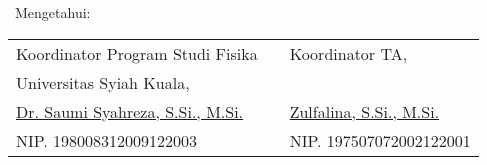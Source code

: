 {\renewcommand{\arraystretch}{0.8}
\begin{center}\
	Mengetahui: \\
	\hspace{0.3cm}
	\begin{tabular}{lll}
		Koordinator Program Studi Fisika&\hspace{2.7cm}	&Koordinator TA,\\
		Universitas Syiah Kuala, &&\\
		[1.5cm]
		\underline{Dr. Saumi Syahreza, S.Si., M.Si.}	&&\underline{Zulfalina, S.Si., M.Si.}\\
		NIP. 198008312009122003						&&NIP. 197507072002122001 				
	\end{tabular}
\end{center}

}

